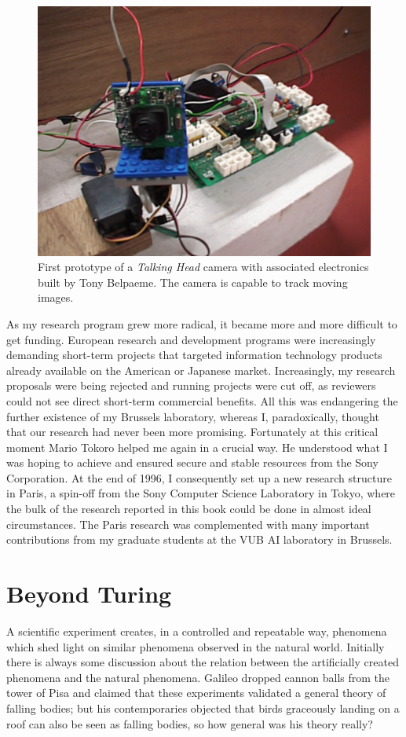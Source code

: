 \begin{figure}[htbp]
  \centerline{\includegraphics[width=.70\textwidth]{chap1/figs/eye}}
\caption{ First prototype of a {\it Talking Head} camera with 
associated electronics built by Tony Belpaeme. The camera is capable to track moving images. }
\label{f:plate7}
\end{figure}

As my research program grew more radical, it became more 
and more difficult to get funding. 
European research and development programs were 
increasingly demanding short-term projects that targeted information
technology products already available on the American or Japanese 
market. Increasingly, my
research proposals were being rejected and running projects were
cut off,
as reviewers could not see direct short-term 
commercial benefits. All this was endangering the further existence
of my Brussels laboratory, whereas I, paradoxically, thought that
our research had never been more promising. 
Fortunately at this critical moment Mario Tokoro
helped me again in a crucial way. He understood what I was
hoping to achieve and ensured secure and stable resources from 
the Sony Corporation. At the end of 1996, I consequently set up a new research
structure in Paris, a spin-off from the Sony Computer Science
Laboratory in Tokyo, where the bulk of the research reported
in this book could be done in almost ideal circumstances. 
The Paris research was complemented with many important 
contributions from my graduate students
at the VUB AI laboratory in Brussels. 

\section{Beyond Turing}

A scientific experiment creates, in a controlled
and repeatable way, phenomena which shed light on
similar phenomena observed in the natural
world. Initially there is
always some discussion about the relation between 
the artificially created phenomena and the natural
phenomena. Galileo dropped cannon balls from
the tower of Pisa and claimed that these experiments validated 
a general theory of falling bodies; but his contemporaries 
objected that birds graceously landing on a roof can
also be seen as falling bodies, so how general was 
his theory really?  

